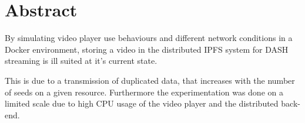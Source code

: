 \begingroup
\let\clearpage\relax
\let\cleardoublepage\relax
\let\cleardoublepage\relax

\chapter*{Abstract}
By simulating video player use behaviours and different network conditions in a Docker environment, storing a video in the distributed \acs{IPFS} system for \acs{DASH} streaming is ill suited at it's current state. 

This is due to a transmission of duplicated data, that increases with the number of seeds on a given resource.
Furthermore the experimentation was done on a limited scale due to high CPU usage of the video player and the distributed back-end.

\vfill

\endgroup			

\vfill